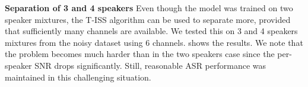 \documentclass[a4paper]{article}
\begin{document}

\textbf{Separation of 3 and 4 speakers} Even though the model was trained on two speaker mixtures, the T-ISS algorithm can be used to separate more, provided that sufficiently many channels are available.
We tested this on 3 and 4 speakers mixtures from the noisy dataset using 6 channels.
 shows the results.
We note that the problem becomes much harder than in the two speakers case since the per-speaker SNR drops significantly.
Still, reasonable ASR performance was maintained in this challenging situation.

\end{document}
